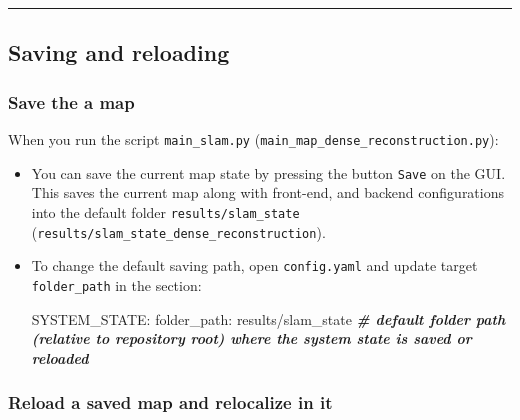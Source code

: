 \documentclass{article}
\newenvironment{Shaded}{\begin{snugshade}}{\end{snugshade}}
\newcommand{\CommentTok}[1]{\textcolor[rgb]{0.00,0.40,1.00}{\textbf{\textit{#1}}}}
\newcommand{\ExtensionTok}[1]{\textcolor[rgb]{0.74,0.68,0.62}{#1}}
\newcommand{\NormalTok}[1]{\textcolor[rgb]{0.74,0.68,0.62}{#1}}
\begin{document}
\begin{center}\rule{0.5\linewidth}{0.5pt}\end{center}

\hypertarget{saving-and-reloading}{%
\subsection{Saving and reloading}\label{saving-and-reloading}}

\hypertarget{save-the-a-map}{%
\subsubsection{Save the a map}\label{save-the-a-map}}

When you run the script \texttt{main\_slam.py}
(\texttt{main\_map\_dense\_reconstruction.py}): 
\begin{itemize}
\item You can save the
current map state by pressing the button \texttt{Save} on the GUI. This
saves the current map along with front-end, and backend configurations
into the default folder \texttt{results/slam\_state}
(\texttt{results/slam\_state\_dense\_reconstruction}). 
\item To change the
default saving path, open \texttt{config.yaml} and update target
\texttt{folder\_path} in the section:
\begin{scriptsize}
\begin{Shaded}
\begin{Highlighting}[]
\ExtensionTok{SYSTEM_STATE}\NormalTok{:}
  \ExtensionTok{folder_path}\NormalTok{: results/slam_state   }\CommentTok{# default folder path (relative to repository root) where the system state is saved or reloaded}
\end{Highlighting}
\end{Shaded}
\end{scriptsize}
\end{itemize}

\hypertarget{reload-a-saved-map-and-relocalize-in-it}{%
\subsubsection{Reload a saved map and relocalize in
it}\label{reload-a-saved-map-and-relocalize-in-it}}
\end{document}
